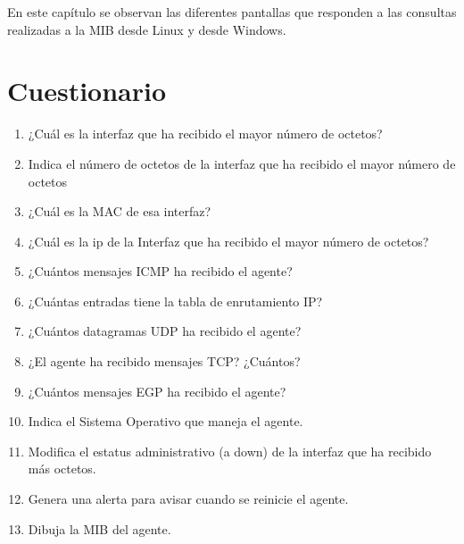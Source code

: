 En este capítulo se observan las diferentes pantallas que responden a las consultas realizadas a la MIB desde Linux y desde Windows.
\section{Cuestionario}
\begin{enumerate}

\item ¿Cuál es la interfaz que ha recibido el mayor número de octetos?
\item Indica el número de octetos  de la interfaz que ha recibido el mayor número de octetos
\item ¿Cuál es la MAC de esa interfaz?
\item ¿Cuál es la ip de la Interfaz que ha recibido el mayor número de octetos?
\item ¿Cuántos mensajes ICMP ha recibido el agente?
\item ¿Cuántas entradas tiene la tabla de enrutamiento IP?
\item ¿Cuántos datagramas UDP ha recibido el agente?
\item ¿El agente ha recibido mensajes TCP? ¿Cuántos?
\item ¿Cuántos mensajes EGP ha recibido el agente?
\item Indica el Sistema Operativo que maneja el agente.
\item Modifica el estatus administrativo (a down) de la interfaz que ha recibido más octetos.
\item Genera una alerta para avisar cuando se reinicie el agente.
\item Dibuja la MIB del agente.
\end{enumerate}